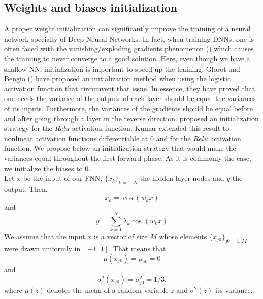 \documentclass[AMS,STIX1COL]{WileyNJD-v2}
\begin{document}
\subsection{Weights and biases initialization}
A proper weight initialization can significantly improve the training of a neural network specially of Deep Neural Networks. In fact, when training DNNs, one is often faced with the vanishing/exploding gradients phenomenon (\cite{Geron}) which causes the training to never converge to a good solution. Here, even though we have a shallow NN, initialization is important to speed up the training. Glorot and Bengio (\cite{Glorot}) have proposed an initialization method when using the logistic activation function that circumvent that issue. In essence, they have proved that one needs the variance of the outputs of each layer should be equal the variances of its inputs. Furthermore, the variances of the gradients should be equal before and after going through a layer in the reverse direction. \cite{Heinit} proposed an initialization strategy for the $Relu$ activation function. Kumar \cite{Kumar} extended this result to nonlinear activation functions differentiable at $0$ and for the $Relu$ activation function. We propose below an initialization strategy that would make the variances equal throughout the first forward phase. As it is commonly the case, we initialize the biases to $0$. \\
Let $x$ be the input of our FNN, $\{x_k\}_{k = 1..N}$ the hidden layer nodes and $y$ the output. Then, 
$$
x_k = \cos(w_k x )
$$
and
$$
y = \sum_{k = 1}^N \lambda_k \cos(w_k x  ) 
$$
 We assume that the input $x$ is a vector of size $M$ whose elements $\{x_{j0}\}_{j0 = 1..M}$ were drawn uniformly in $[-1 \;\; 1]$. That means that $$\mu(x_{j0}) = \mu_{j0} = 0$$ and $$\sigma^2(x_{j0}) = \sigma^2_{j0} = 1/3. $$ where $\mu(z)$ denotes the mean of a random variable $z$ and $\sigma^2(z)$ its variance. 
\end{document}
